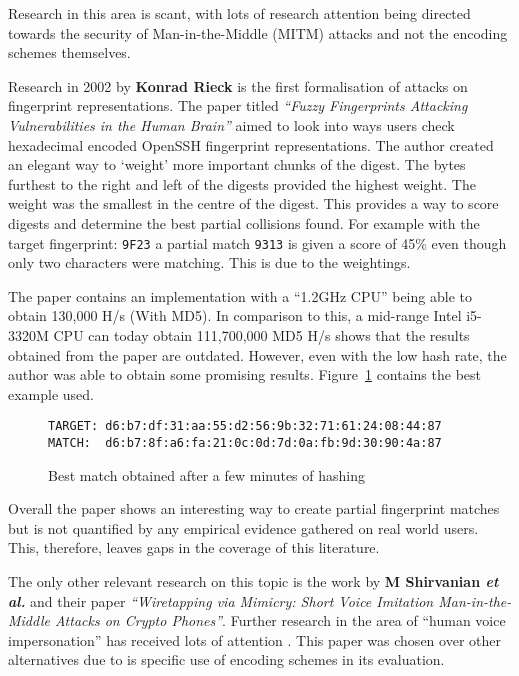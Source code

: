 Research in this area is scant, with lots of research attention being directed towards the security of Man-in-the-Middle (MITM) attacks and not the encoding schemes themselves.

Research in 2002 by \textbf{Konrad Rieck}\cite{rieck2002fuzzy} is the first formalisation of attacks on fingerprint representations. The paper titled \textit{``Fuzzy Fingerprints Attacking Vulnerabilities in the Human Brain''}
aimed to look into ways users check hexadecimal encoded OpenSSH fingerprint representations. The author created an elegant way to `weight' more important chunks of the digest. The bytes furthest to the right and left of the digests provided the highest weight. The weight was the smallest in the centre of the digest. This provides a way to score digests and determine the best partial collisions found. For example with the target fingerprint: \verb|9F23| a partial match \verb|9313| is given a score of 45\% even though only two characters were matching. This is due to the weightings.

The paper contains an implementation with a ``1.2GHz CPU'' being able to obtain 130,000 H/s (With MD5). In comparison to this, a mid-range Intel i5-3320M CPU can today obtain 111,700,000 MD5 H/s shows that the results obtained from the paper are outdated. However, even with the low hash rate, the author was able to obtain some promising results. Figure~\ref{ref:fuzz} contains the best example used.

\begin{figure}[!h]
    \begin{center}
        \verb|TARGET: d6:b7:df:31:aa:55:d2:56:9b:32:71:61:24:08:44:87|
        \verb|MATCH:  d6:b7:8f:a6:fa:21:0c:0d:7d:0a:fb:9d:30:90:4a:87|
    \end{center}
    \caption{Best match obtained after a few minutes of hashing}
    \label{ref:fuzz}
\end{figure}

Overall the paper shows an interesting way to create partial fingerprint matches but is not quantified by any empirical evidence gathered on real world users. This, therefore, leaves gaps in the coverage of this literature.

The only other relevant research on this topic is the work by \textbf{M Shirvanian \textit{et al.}}\cite{shirvanian2014wiretapping} 
and their paper \textit{``Wiretapping via Mimicry: Short 
Voice Imitation Man-in-the-Middle Attacks on Crypto 
Phones''}. Further research in the area of ``human voice impersonation'' has received lots of attention \cite{mukhopadhyay2015all}\cite{chen2017you}\cite{wu2015spoofing}. This paper was chosen over other alternatives due to is specific use of encoding schemes in its evaluation.

